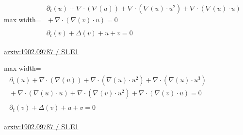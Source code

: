 \documentclass[10pt,a4paper]{article}
\begin{document}
\begin{minipage}{\linewidth}
\begin{center}\begin{adjustbox}{max width=\linewidth}$\displaystyle\begin{gathered}\begin{gathered}\partial_{t}(u)+\nabla\cdot(\nabla(u))+\nabla\cdot(\nabla(u)\cdot u^{2})+\nabla\cdot(\nabla(u)\cdot u)\\[-1pt]{}+\nabla\cdot(\nabla(v)\cdot u)=0\end{gathered}\\[5pt]\begin{gathered}\partial_{t}(v)+\Delta(v)+u+v=0\end{gathered}\end{gathered}$\end{adjustbox}\end{center}
{\small \href{https://arxiv.org/html/1902.09787#S1.E1}{arxiv:1902.09787 / S1.E1}}\par
\end{minipage}\par\vspace{7mm}

\begin{minipage}{\linewidth}
\begin{center}\begin{adjustbox}{max width=\linewidth}$\displaystyle\begin{gathered}\begin{gathered}\partial_{t}(u)+\nabla\cdot(\nabla(u))+\nabla\cdot(\nabla(u)\cdot u^{2})+\nabla\cdot(\nabla(u)\cdot u^{3})\\[-1pt]{}+\nabla\cdot(\nabla(u)\cdot u)+\nabla\cdot(\nabla(v)\cdot u^{2})+\nabla\cdot(\nabla(v)\cdot u)=0\end{gathered}\\[5pt]\begin{gathered}\partial_{t}(v)+\Delta(v)+u+v=0\end{gathered}\end{gathered}$\end{adjustbox}\end{center}
{\small \href{https://arxiv.org/html/1902.09787#S1.E1}{arxiv:1902.09787 / S1.E1}}\par
\end{minipage}\par\vspace{7mm}
\end{document}
